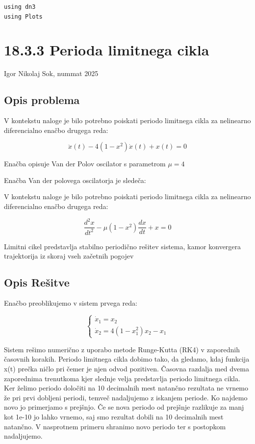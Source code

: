 \documentclass[12pt,a4paper]{article}
\begin{document}
\begin{verbatim}
using dn3
using Plots
\end{verbatim}

\section{18.3.3 Perioda limitnega cikla}
Igor Nikolaj Sok, nummat 2025


\subsection{Opis problema}
V kontekstu naloge je bilo potrebno poiskati periodo limitnega cikla za nelinearno diferencialno enačbo drugega reda:

\[
\ddot{x}(t) - 4(1 - x^2)\dot{x}(t) + x(t) = 0
\]

Enačba opisuje Van der Polov oscilator s parametrom $\mu = 4$


Enačba Van der polovega oscilatorja je sledeča:


V kontekstu naloge je bilo potrebno poiskati periodo limitnega cikla za nelinearno diferencialno enačbo drugega reda:

\[
\frac{d^2x}{dt^2} - \mu (1 - x^2)\frac{dx}{dt} + x = 0
\]

Limitni cikel predstavlja stabilno periodično rešitev sistema, kamor konvergera trajektorija iz skoraj vseh začetnih pogojev


\subsection{Opis Rešitve}

Enačbo preoblikujemo v sistem prvega reda:


\[
\begin{cases}
\dot{x}_1 = x_2 \\
\dot{x}_2 = 4(1 - x_1^2)x_2 - x_1
\end{cases}
\]

Sistem rešimo numerično z uporabo metode Runge-Kutta (RK4) v zaporednih časovnih korakih. Periodo limitnega cikla dobimo tako, da gledamo, kdaj funkcija x(t) prečka ničlo pri čemer je njen odvod pozitiven. Časovna razdalja med dvema zaporednima trenutkoma kjer slednje velja predstavlja periodo limitnega cikla. Ker želimo periodo določiti na 10 decimalnih mest natančno rezultata ne vrnemo že pri prvi dobljeni periodi, temveč nadaljujemo z iskanjem periode. Ko najdemo novo jo primerjamo s prejšnjo. Če se nova periodo od prejšnje razlikuje za manj kot 1e-10 jo lahko vrnemo, saj smo rezultat dobili na 10 decimalnih mest natančno. V nasprotnem primeru shranimo novo periodo ter s postopkom nadaljujemo.
\end{document}
